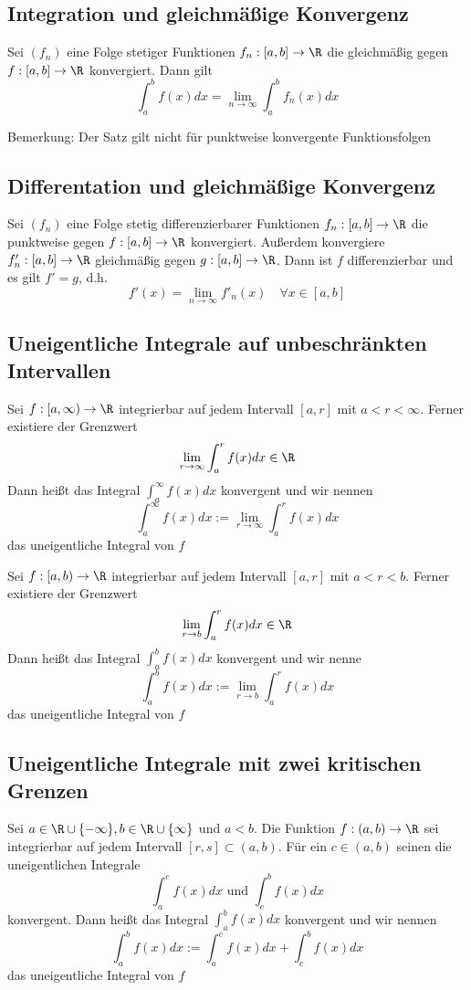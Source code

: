 	\subsection{Integration und gleichmäßige Konvergenz}
		\begin{Satz} [ ]
			Sei $(f_n)$ eine Folge stetiger Funktionen $f_n:[a, b]\to\R$ die gleichmäßig gegen $f:[a, b]\to\R$ konvergiert. Dann gilt
			$$
				\int_a^bf(x)dx=\lim_{n\to\infty}\int_a^bf_n(x)dx
			$$
		\end{Satz}
		Bemerkung: \newline
		Der Satz gilt nicht für punktweise konvergente Funktionsfolgen
	\subsection{Differentation und gleichmäßige Konvergenz}
		\begin{Satz} [ ]
			Sei $(f_n)$ eine Folge stetig differenzierbarer Funktionen $f_n:[a, b]\to\R$ die punktweise gegen $f:[a, b]\to\R$ konvergiert. Außerdem konvergiere $f'_n:[a, b]\to\R$ gleichmäßig gegen $g:[a, b]\to\R$. Dann ist $f$ differenzierbar und es gilt $f'=g$, d.h.
			$$
				f'(x)=\lim_{n\to\infty}f'_n(x)\quad\forall x\in[a, b]
			$$
		\end{Satz}
	\subsection{Uneigentliche Integrale auf unbeschränkten Intervallen}
		\begin{Definition} 
			Sei $f:[a, \infty)\to\R$ integrierbar auf jedem Intervall $[a, r]$ mit $a<r<\infty$. Ferner existiere der Grenzwert
			$$
				\lim_{r\to\infty}\int_a^rf(x)dx\in\R
			$$
			Dann heißt das Integral $\displaystyle\int_a^\infty f(x)dx$ konvergent und wir nennen 
			$$
				\int_a^\infty f(x)dx:=\lim_{r\to\infty}\int_a^rf(x)dx
			$$
			das uneigentliche Integral von $f$
		\end{Definition}
		\begin{Definition} 
			Sei $f:[a, b)\to\R$ integrierbar auf jedem Intervall $[a, r]$ mit $a<r<b$. Ferner existiere der Grenzwert
			$$
				\lim_{r\to b}\int_a^rf(x)dx\in\R
			$$
			Dann heißt das Integral $\displaystyle\int_a^bf(x)dx$ konvergent und wir nenne
			$$
				\int_a^bf(x)dx:=\lim_{r\to b}\int_a^rf(x)dx
			$$
			das uneigentliche Integral von $f$
		\end{Definition}
	\subsection{Uneigentliche Integrale mit zwei kritischen Grenzen}
		\begin{Definition} 
			Sei $a\in\R\cup\{-\infty\},b\in\R\cup\{\infty\}$ und $a<b$. Die Funktion $f:(a, b)\to\R$ sei integrierbar auf jedem Intervall $[r, s]\subset(a, b)$. Für ein $c\in(a, b)$ seinen die uneigentlichen Integrale
			$$
				\int_a^cf(x)dx \text{ und } \int_c^bf(x)dx
			$$
			konvergent. Dann heißt das Integral $\displaystyle\int_a^bf(x)dx$ konvergent und wir nennen
			$$
				\int_a^bf(x)dx:=\int_a^cf(x)dx+\int_c^bf(x)dx
			$$
			das uneigentliche Integral von $f$
		\end{Definition}
